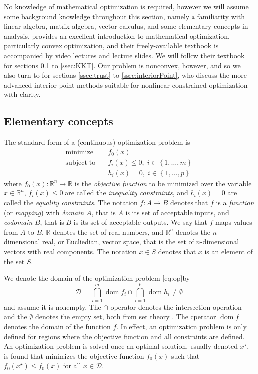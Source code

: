 No knowledge of mathematical optimization is required, however we will assume some background knowledge throughout this section, namely a familiarity with linear algebra, matrix algebra, vector calculus, and some elementary concepts in analysis. \citet{Boyd04} provides an excellent introduction to mathematical optimization, particularly convex optimization, and their freely-available textbook is accompanied by video lectures and lecture slides. We will follow their textbook for sections \ref{ssec:elementaryOptimization} to \ref{ssec:KKT}. Our problem is nonconvex, however, and so we also turn to \citet{Nocedal06} for sections \ref{ssec:trust} to \ref{ssec:interiorPoint}, who discuss the more advanced interior-point methods suitable for nonlinear constrained optimization with clarity.

\subsection{Elementary concepts} \label{ssec:elementaryOptimization}
The standard form of a (continuous) optimization problem is
\begin{align} \label{eq:op}
\mathrm{minimize}   \quad & f_0(x) \nonumber \\
\mathrm{subject\;to} \quad &
f_i(x) \leq 0, \; i \in \left\{1, \dots, m \right\}\\
& h_i(x) = 0, \; i \in \left\{1, \dots, p \right\} \nonumber
\end{align}
where $f_0(x): \mathbb{R}^n \rightarrow \mathbb{R}$ is the \emph{objective function} to be minimized over the variable $x \in \mathbb{R}^n$, $f_i(x) \leq 0$ are called the \emph{inequality constraints}, and $h_i(x) = 0$ are called the \emph{equality constraints}. The notation $f: A \rightarrow B$ denotes that $f$ is a \emph{function} (or \emph{mapping}) with \emph{domain} $A$, that is $A$ is its set of acceptable inputs, and \emph{codomain} $B$, that is $B$ is its set of acceptable outputs. We say that $f$ maps values from $A$ to $B$. $\mathbb{R}$ denotes the set of real numbers, and $\mathbb{R}^n$ denotes the $n$-dimensional real, or Eucliedian, vector space, that is the set of $n$-dimensional vectors with real components. The notation $x \in S$ denotes that $x$ is an element of the set $S$.

We denote the domain of the optimization problem \eqref{eq:op}by
\begin{equation}
\mathcal{D} = \bigcap_{i=1}^m \operatorname{dom} f_i \cap \bigcap_{i=1}^p \operatorname{dom} h_i \neq \emptyset
\end{equation}
and assume it is nonempty. The $\cap$ operator denotes the intersection operation and the $\emptyset$ denotes the empty set, both from set theory \citep{Halmos17}. The operator $\operatorname{dom} f$ denotes the domain of the function $f$. In effect, an optimization problem is only defined for regions where the objective function and all constraints are defined. An optimization problem is solved once an optimal solution, usually denoted $x^\star$, is found that minimizes the objective function $f_0(x)$ such that $f_0(x^\star) \le f_0(x)$ for all $x \in \mathcal{D}$.

